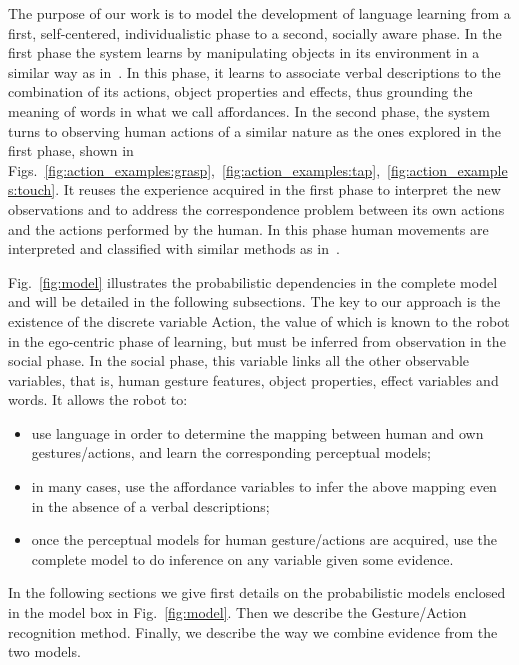 The purpose of
our work
is to model the development of language learning from a first, self-centered, individualistic phase to a second, socially aware phase.
In the first phase the system learns by manipulating objects in its environment in a similar way as in~\cite{salvi:2012:smcb}.
In this phase, it learns to associate verbal descriptions to the combination of its actions, object properties and effects, thus grounding the meaning of words in what we call affordances.
In the second phase, the system turns to observing human actions of a similar nature as the ones explored in the first phase, shown in Figs.~\ref{fig:action_examples:grasp},~\ref{fig:action_examples:tap},~\ref{fig:action_examples:touch}.
It reuses the experience acquired in the first phase to interpret the new observations and to address the correspondence problem between its own actions and the actions performed by the human.
In this phase human movements are interpreted and classified with similar methods as in~\cite{saponaro:2013:crhri}.

Fig.~\ref{fig:model} illustrates the probabilistic dependencies in the complete model and will be detailed in the following subsections.
The key to our approach is the existence of the discrete variable Action, the value of which is known to the robot in the ego-centric phase of learning, but must be inferred from observation in the social phase.
In the social phase, this variable links all the other observable variables, that is, human gesture features, object properties, effect variables and words.
It allows the robot to:
\begin{itemize}
\item use language in order to determine the mapping between human and own gestures/actions, and learn the corresponding perceptual models;
\item in many cases, use the affordance variables to infer the above mapping even in the absence of a verbal descriptions;
\item once the perceptual models for human gesture/actions are acquired, use the complete model to do inference on any variable given some evidence.
\end{itemize}
In the following sections we give first details on the probabilistic models enclosed in the \AffWords{} model box in Fig.~\ref{fig:model}.
Then we describe the Gesture/Action recognition method.
Finally, we describe the way we combine evidence from the two models.

